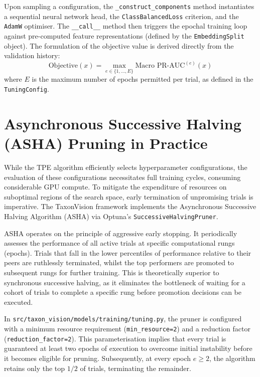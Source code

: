 Upon sampling a configuration, the \texttt{\_construct\_components} method instantiates a sequential neural network head, the \texttt{ClassBalancedLoss} criterion, and the \texttt{AdamW} optimiser. The \texttt{\_\_call\_\_} method then triggers the epochal training loop against pre-computed feature representations (defined by the \texttt{EmbeddingSplit} object). The formulation of the objective value is derived directly from the validation history:
\begin{equation}
    \text{Objective}(x) = \max_{e \in \{1, \dots, E\}} \text{Macro PR-AUC}^{(e)}(x)
\end{equation}
where $E$ is the maximum number of epochs permitted per trial, as defined in the \texttt{TuningConfig}.

\section{Asynchronous Successive Halving (ASHA) Pruning in Practice}
\label{sec:asha_pruning_in_practice}

While the TPE algorithm efficiently selects hyperparameter configurations, the evaluation of these configurations necessitates full training cycles, consuming considerable GPU compute. To mitigate the expenditure of resources on suboptimal regions of the search space, early termination of unpromising trials is imperative. The TaxonVision framework implements the Asynchronous Successive Halving Algorithm (ASHA) via Optuna's \texttt{SuccessiveHalvingPruner}.

ASHA operates on the principle of aggressive early stopping. It periodically assesses the performance of all active trials at specific computational rungs (epochs). Trials that fall in the lower percentiles of performance relative to their peers are ruthlessly terminated, whilst the top performers are promoted to subsequent rungs for further training. This is theoretically superior to synchronous successive halving, as it eliminates the bottleneck of waiting for a cohort of trials to complete a specific rung before promotion decisions can be executed.

In \texttt{src/taxon\_vision/models/training/tuning.py}, the pruner is configured with a minimum resource requirement (\texttt{min\_resource=2}) and a reduction factor (\texttt{reduction\_factor=2}). This parameterisation implies that every trial is guaranteed at least two epochs of execution to overcome initial instability before it becomes eligible for pruning. Subsequently, at every epoch $e \geq 2$, the algorithm retains only the top $1 / 2$ of trials, terminating the remainder.

